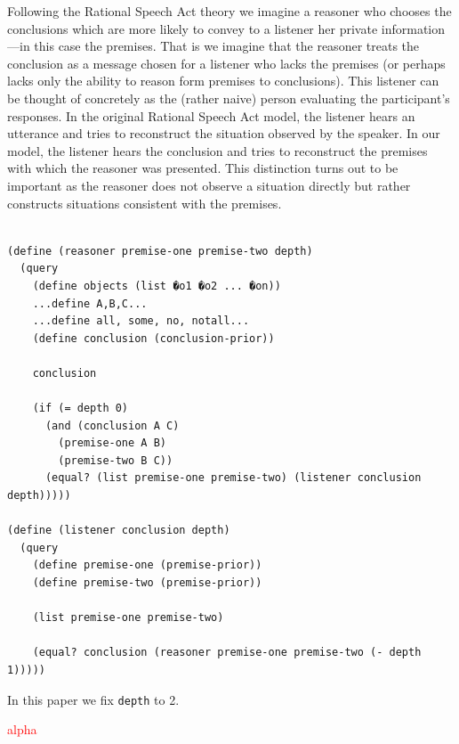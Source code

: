 \documentclass[10pt,letterpaper]{article}
\newcommand{\red}[1]{\textcolor{Red}{#1}}
\begin{document}
Following the Rational Speech Act theory \cite{Goodman2013,Frank2012a} we imagine a reasoner who chooses the conclusions which are more likely to convey to a listener her private information---in this case the premises. That is we imagine that the reasoner treats the conclusion as a message chosen for a listener who lacks the premises (or perhaps lacks only the ability to reason form premises to conclusions).
This listener can be thought of concretely as the (rather naive) person evaluating the participant's responses. In the original Rational Speech Act model, the listener hears an utterance and tries to reconstruct the situation observed by the speaker. In our model, the listener hears the conclusion and tries to reconstruct the premises with which the reasoner was presented. This distinction turns out to be important as the reasoner does not observe a situation directly but rather constructs situations consistent with the premises. 

\begin{lstlisting}

(define (reasoner premise-one premise-two depth)
  (query 
    (define objects (list �o1 �o2 ... �on)) 
    ...define A,B,C...
    ...define all, some, no, notall...
    (define conclusion (conclusion-prior))
 
    conclusion
    
    (if (= depth 0)
      (and (conclusion A C) 
        (premise-one A B)
        (premise-two B C))
      (equal? (list premise-one premise-two) (listener conclusion depth)))))
       
(define (listener conclusion depth)
  (query 
    (define premise-one (premise-prior))
    (define premise-two (premise-prior))
    
    (list premise-one premise-two)
    
    (equal? conclusion (reasoner premise-one premise-two (- depth 1)))))
\end{lstlisting}
In this paper we fix \lstinline{depth} to 2.

\red{alpha}
\end{document}
